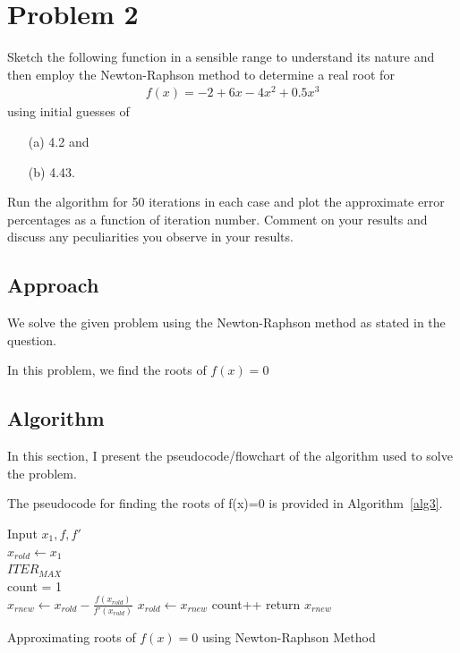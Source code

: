 \documentclass[titlepage, 11pt]{article}
\begin{document}
\section{Problem 2}
Sketch the following function in a sensible range to understand its nature and then employ the Newton-Raphson method to determine a real root for
\begin{align}
    f(x) = -2 + 6x - 4x^2 + 0.5x^3
\end{align} 
using initial guesses of
\begin{itemize}
    \item [(a)] 4.2 and
    \item [(b)] 4.43.
\end{itemize}
Run the algorithm for 50 iterations in each case and plot the approximate error percentages as a function of iteration number. Comment on your results and discuss any peculiarities you observe in your results. 

\subsection{Approach}

We solve the given problem using the Newton-Raphson method as stated in the question. 

In this problem, we find the roots of $f(x)=0$ 


\subsection{Algorithm}
In this section, I present the pseudocode/flowchart of the algorithm used to solve the problem.

The pseudocode for finding the roots of f(x)=0 is provided in Algorithm~\ref{alg3}.
\begin{center}
\begin{algorithm}[H]\label{alg3}

\SetAlgoLined

Input $x_1,f,f'$ \\
$x_{rold} \gets x_1$ \\
$ITER_{MAX}$  \\
count = 1 \\
 {
$x_{rnew} \gets x_{rold} - \frac{f(x_{rold})}{f'(x_{rold})}$ \;
$x_{rold} \gets x_{rnew}$\;
count++ \;
return ${x_{rnew}}$\;
}

 \caption{Approximating roots of $f(x)=0$ using Newton-Raphson Method}
\end{algorithm} 
\end{center}
\end{document}
